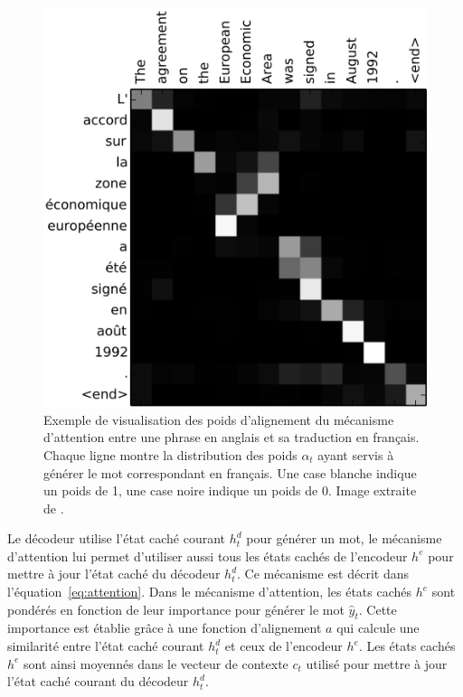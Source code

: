 \begin{figure}
    \centering
    \includegraphics[scale=0.3]{2_production_mots_cles/attention_alignment.png}
    \caption{Exemple de visualisation des poids d'alignement du mécanisme d'attention entre une phrase en anglais et sa traduction en français. Chaque ligne montre la distribution des poids $\alpha_{t}$ ayant servis à générer le mot correspondant en français. Une case blanche indique un poids de 1, une case noire indique un poids de 0. Image extraite de \citet{bahdanau_neural_2014}.}
    \label{fig:attention_alignment}
\end{figure}


Le décodeur utilise l'état caché courant $h^d_t$ pour générer un mot, le mécanisme d'attention lui permet d'utiliser aussi tous les états cachés de l'encodeur $h^e$ pour mettre à jour l'état caché du décodeur $h^d_t$. Ce mécanisme est décrit dans l'équation~\ref{eq:attention}.
Dans le mécanisme d'attention, les états cachés $h^e$ sont pondérés en fonction de leur importance pour générer le mot $\hat{y}_t$.
Cette importance est établie grâce à une fonction d'alignement $a$ qui calcule une similarité entre l'état caché courant $h^d_t$ et ceux de l'encodeur $h^e$.
Les états cachés $h^e$ sont ainsi moyennés dans le vecteur de contexte $c_t$ utilisé pour mettre à jour l'état caché courant du décodeur $h^d_t$.


